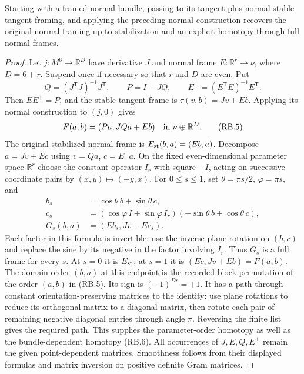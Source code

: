 \begin{lemma}
\label{courseIII:pt-normal-inverse-comparison}
Starting with a framed normal bundle, passing to its tangent-plus-normal
stable tangent framing, and applying the preceding normal construction
recovers the original normal framing up to stabilization and an explicit
homotopy through full normal frames.
\end{lemma}

\begin{proof}
Let $j:M^6\to\mathbb R^D$ have derivative $J$ and normal frame
$E:\mathbb R^r\to\nu$, where $D=6+r$.  Suspend once if necessary
so that $r$ and $D$ are even.  Put
\[
 Q=(J^{\mathsf T}J)^{-1}J^{\mathsf T},\qquad
 P=I-JQ,
 \qquad E^+=(E^{\mathsf T}E)^{-1}E^{\mathsf T}.
\]
Then $EE^+=P$, and the stable tangent frame is
$\tau(v,b)=Jv+Eb$.  Applying its normal construction to $(j,0)$ gives
\[
 F(a,b)=(Pa,JQa+Eb)
       \quad\hbox{in }\nu\oplus\mathbb R^D.
 \tag{RB.5}
\]
The original stabilized normal frame is
$E_{\rm st}(b,a)=(Eb,a)$.  Decompose $a=Jv+Ec$ using
$v=Qa$, $c=E^+a$.  On the fixed even-dimensional parameter space
$\mathbb R^r$ choose the constant operator $I_r$ with square $-I$,
acting on successive coordinate pairs by $(x,y)\mapsto(-y,x)$.
For $0\le s\le1$, set $\theta=\pi s/2$, $\varphi=\pi s$, and
\[
 \begin{aligned}
 b_s&=\cos\theta\,b+\sin\theta\,c,\\
 c_s&=(\cos\varphi\,I+\sin\varphi\,I_r)
             (-\sin\theta\,b+\cos\theta\,c),\\
 G_s(b,a)&=(Eb_s,Jv+Ec_s).
 \end{aligned}
 \tag{RB.6}
\]
Each factor in this formula is invertible: use the inverse plane
rotation on $(b,c)$ and replace the sine by its negative in the factor
involving $I_r$.  Thus $G_s$ is a full frame for every $s$.  At $s=0$
it is $E_{\rm st}$; at $s=1$ it is $(Ec,Jv+Eb)=F(a,b)$.
The domain order $(b,a)$ at this endpoint is the recorded block
permutation of the order $(a,b)$ in (RB.5).  Its sign is
$(-1)^{Dr}=+1$.  It has a path through constant orientation-preserving
matrices to the identity: use plane rotations to reduce its orthogonal
matrix to a diagonal matrix, then rotate each pair of remaining
negative diagonal entries through angle $\pi$.  Reversing the finite
list gives the required path.  This supplies the parameter-order
homotopy as well as the bundle-dependent homotopy (RB.6).
All occurrences of $J,E,Q,E^+$ remain the given point-dependent
matrices.  Smoothness follows from their displayed formulas and matrix
inversion on positive definite Gram matrices.
\end{proof}

